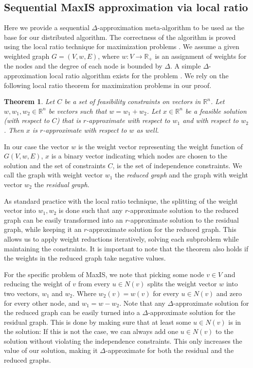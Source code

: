 \documentclass[11pt]{article}
\newtheorem{theorem}{Theorem}[section]
\begin{document}
\subsection{Sequential MaxIS approximation via local ratio}
\label{sec:sequentialMaxIS}

Here we provide a sequential $\Delta$-approximation meta-algorithm to be used as the base for our distributed algorithm. The correctness of the algorithm is proved using the local ratio technique for maximization problems \cite{bar2001unified}.
We assume a given weighted graph $G=(V,w,E)$, where $w : V \rightarrow \mathbb{R}_+$ is an assignment of weights for the nodes and the degree of each node is bounded by $\Delta$. A simple $\Delta$-approximation local ratio algorithm exists for the problem \cite{bar2004local}. We rely on the following local ratio theorem for maximization problems \cite[Theorem 9]{bar2004local} in our proof.

\begin{theorem}
	Let $C$ be a set of feasibility constraints on vectors in $\mathbb{R}^n$. Let $w,w_1,w_2 \in \mathbb{R}^n$ be vectors such that $w=w_1+w_2$. Let $x\in \mathbb{R}^n$ be a feasible solution (with respect to $C$) that is $r$-approximate with respect to $w_1$ and with respect to $w_2$. Then $x$ is $r$-approximate with respect to $w$ as well.
\end{theorem}
In our case the vector $w$ is the weight vector representing the weight function of $G(V,w,E)$, $x$ is a binary vector indicating which nodes are chosen to the solution and the set of constraints $C$, is the set of independence constraints. We call the graph with weight vector $w_1$ the \emph{reduced graph}  and the graph with weight vector $w_2$ the \emph{residual graph}.

As standard practice with the local ratio technique, the splitting of the weight vector into $w_1,w_2$ is done such that any $r$-approximate solution to the reduced graph can be easily transformed into an $r$-approximate solution to the residual graph, while keeping it an $r$-approximate solution for the reduced graph. This allows us to apply weight reductions iteratively, solving each subproblem while maintaining the constraints. It is important to note that the theorem also holds if the weights in the reduced graph take negative values.

For the specific problem of MaxIS, we note that picking some node $v\in V$ and reducing the weight of $v$ from every $u \in N(v)$ splits the weight vector $w$ into two vectors, $w_1$ and $w_2$. Where $w_2(v)=w(v)$ for every $u\in N(v)$ and zero for every other node, and $w_1=w-w_2$.
Note that any $\Delta$-approximate solution for the reduced graph can be easily turned into a $\Delta$-approximate solution for the residual graph. This is done by making sure that at least some $u \in N(v)$ is in the solution: If this is not the case, we can always add one $u\in N(v)$ to the solution without violating the independence constraints. This only increases the value of our solution, making it $\Delta$-approximate for both the residual and the reduced graphs.
\end{document}
